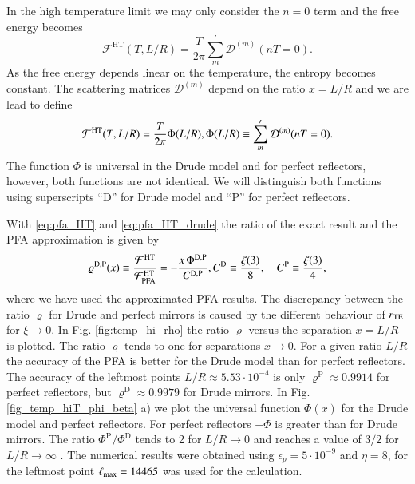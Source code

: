 In the high temperature limit we may only consider the $n=0$ term and the free
energy becomes
\begin{equation}
\mathcal{F}^\text{HT}\left(T, L/R\right) = \frac{T}{2\pi} \sum_m^\prime \mathcal{D}^{(m)}(nT=0).
\end{equation}
As the free energy depends linear on the temperature, the entropy becomes
constant. The scattering matrices $\mathcal{D}^{(m)}$ depend on the ratio
$x=L/R$ and we are lead to define
\begin{equation}
\label{eq:temp_hi_def_phi}
\mathcal{F}^\text{HT}(T, L/R) = \frac{T}{2\pi} \Phi(L/R), \\ \Phi(L/R) \equiv \sum_m^\prime \mathcal{D}^{(m)}(nT=0).
\end{equation}
The function $\Phi$ is universal in the Drude model and for perfect reflectors,
however, both functions are not identical. We will distinguish both functions
using superscripts ``D'' for Drude model and ``P'' for perfect reflectors.

With \eqref{eq:pfa_HT} and \eqref{eq:pfa_HT_drude} the ratio of the exact
result and the PFA approximation is given by
\begin{equation}
\varrho^{\text{D},\text{P}}(x) \equiv \frac{\mathcal{F}^\text{HT}}{\mathcal{F}^\text{HT}_\text{PFA}} = -\frac{x\,\Phi^{\text{D},\text{P}}}{C^{\text{D},\text{P}}}, \\
C^\text{D} \equiv \frac{\xi(3)}{8}, \quad C^\text{P} \equiv \frac{\xi(3)}{4},
\end{equation}
where we have used the approximated PFA results. The discrepancy between the
ratio $\varrho$ for Drude and perfect mirrors is caused by the different behaviour
of $r_{\mathrm{TE}}$ for $\xi\to0$. In Fig. \ref{fig:temp_hi_rho} the ratio $\varrho$ versus
the separation $x=L/R$ is plotted. The ratio $\varrho$ tends to one for separations
$x\to0$.
For a given ratio $L/R$ the accuracy of the
PFA is better for the Drude model than for perfect reflectors. The accuracy of the leftmost
points $L/R\approx5.53\cdot10^{-4}$ is only $\varrho^\text{P}\approx0.9914$ for perfect
reflectors, but $\varrho^\text{D}\approx0.9979$ for Drude mirrors.
In Fig. \ref{fig_temp_hiT_phi_beta} a) we plot the universal function $\Phi(x)$ for the
Drude model and perfect reflectors. For perfect reflectors $-\Phi$ is greater
than for Drude mirrors. The ratio $\Phi^\text{P}/\Phi^\text{D}$ tends to 2 for
$L/R\to0$ and reaches a value of $3/2$ for $L/R\to\infty$ \cite{ThermalCasimirEffect}.
The numerical results were obtained using $\epsilon_p=5\cdot10^{-9}$ and
$\eta=8$, for the leftmost point ${\ell_\text{max}}=14465$ was used for the calculation.

